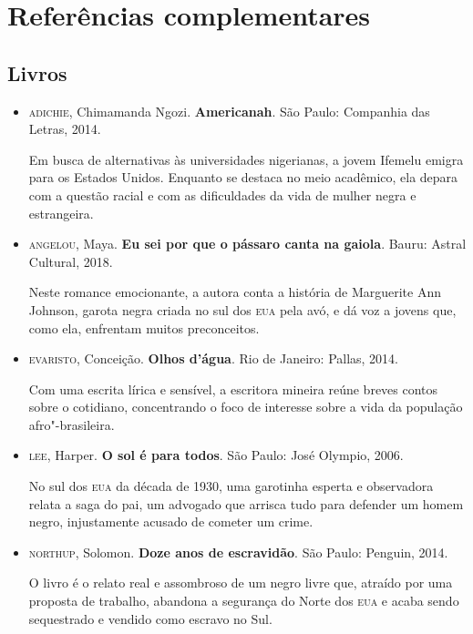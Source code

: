 \documentclass[12pt]{extarticle}
\begin{document}
\section{Referências complementares}

\subsection{Livros}

\begin{itemize}
\item\textsc{adichie}, Chimamanda Ngozi. \textbf{Americanah}. São Paulo: Companhia
  das Letras, 2014.

Em busca de alternativas às universidades nigerianas, a jovem Ifemelu
emigra para os Estados Unidos. Enquanto se destaca no meio acadêmico,
ela depara com a questão racial e com as dificuldades da vida de mulher
negra e estrangeira.

\item\textsc{angelou}, Maya. \textbf{Eu sei por que o pássaro canta na gaiola}.
  Bauru: Astral Cultural, 2018.

Neste romance emocionante, a autora conta a história de Marguerite Ann
Johnson, garota negra criada no sul dos \textsc{eua} pela avó, e dá voz a jovens
que, como ela, enfrentam muitos preconceitos.

\item\textsc{evaristo}, Conceição. \textbf{Olhos d'água}. Rio de Janeiro: Pallas, 2014.

Com uma escrita lírica e sensível, a escritora mineira reúne breves
contos sobre o cotidiano, concentrando o foco de interesse sobre a vida
da população afro"-brasileira.

\item\textsc{lee}, Harper. \textbf{O sol é para todos}. São Paulo: José Olympio,
  2006.

No sul dos \textsc{eua} da década de 1930, uma garotinha esperta e observadora
relata a saga do pai, um advogado que arrisca tudo para defender um
homem negro, injustamente acusado de cometer um crime.

\item\textsc{northup}, Solomon. \textbf{Doze anos de escravidão}. São Paulo:
  Penguin, 2014.

O livro é o relato real e assombroso de um negro livre que, atraído por
uma proposta de trabalho, abandona a segurança do Norte dos \textsc{eua} e acaba
sendo sequestrado e vendido como escravo no Sul.


\end{itemize}
\end{document}
